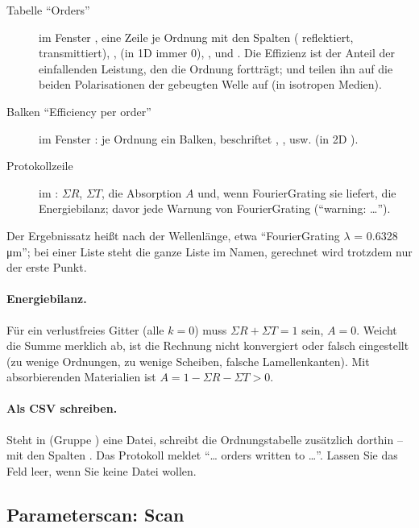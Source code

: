 \begin{description}
  \item[Tabelle \enquote{Orders}] im Fenster , eine Zeile je Ordnung mit den Spalten
     ( reflektiert,  transmittiert), ,  (in 1D immer 0),
    ,  und . Die Effizienz ist der Anteil der einfallenden
    Leistung, den die Ordnung fortträgt;  und  teilen ihn auf die beiden
    Polarisationen der gebeugten Welle auf (in isotropen Medien).
  \item[Balken \enquote{Efficiency per order}] im Fenster : je Ordnung ein Balken,
    beschriftet , ,  usw. (in 2D ).
  \item[Protokollzeile] im : $\Sigma R$, $\Sigma T$, die Absorption $A$ und,
    wenn FourierGrating sie liefert, die Energiebilanz; davor jede Warnung von FourierGrating
    (\enquote{warning: …}).
\end{description}

Der Ergebnissatz heißt nach der Wellenlänge, etwa \enquote{FourierGrating $\lambda$ = 0.6328
\si{\micro\metre}}; bei einer Liste steht die ganze Liste im Namen, gerechnet wird trotzdem nur
der erste Punkt.

\paragraph{Energiebilanz.} Für ein verlustfreies Gitter (alle $k = 0$) muss
$\Sigma R + \Sigma T = 1$ sein, $A = 0$. Weicht die Summe merklich ab, ist die Rechnung nicht
konvergiert oder falsch eingestellt (zu wenige Ordnungen, zu wenige Scheiben, falsche
Lamellenkanten). Mit absorbierenden Materialien ist $A = 1 - \Sigma R - \Sigma T > 0$.

\paragraph{Als CSV schreiben.} Steht in  (Gruppe ) eine
Datei, schreibt  die Ordnungstabelle zusätzlich dorthin -- mit den Spalten
. Das Protokoll meldet \enquote{\dots{} orders written to
\dots}. Lassen Sie das Feld leer, wenn Sie keine Datei wollen.

\subsection{Parameterscan: Scan}\label{sec:fg-scan}

